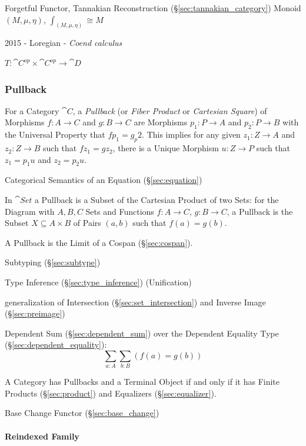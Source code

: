 Forgetful Functor, Tannakian Reconstruction (\S\ref{sec:tannakian_category})
Monoid $(M,\mu,\eta)$, $\int_{(M,\mu,\eta)} \cong M$

2015 - Loregian - \emph{Coend calculus}

$T : \cat{C}^{op} \times \cat{C}^{op} \rightarrow \cat{D}$



\subsubsection{Pullback}\label{sec:pullback}

For a Category $\cat{C}$, a \emph{Pullback} (or \emph{Fiber
  Product} or \emph{Cartesian Square}) of Morphisms $f : A \rightarrow
C$ and $g : B \rightarrow C$ are Morphisms $p_1 : P \rightarrow A$ and
$p_2 : P \rightarrow B$ with the Universal Property that $fp_1 =
g_p2$. This implies for any given $z_1 : Z \rightarrow A$ and $z_2 : Z
\rightarrow B$ such that $fz_1 = gz_2$, there is a Unique Morphism $u
: Z \rightarrow P$ such that $z_1 = p_1 u$ and $z_2 = p_2 u$.

Categorical Semantics of an Equation (\S\ref{sec:equation})

In $\cat{Set}$ a Pullback is a Subset of the Cartesian Product of two
Sets: for the Diagram with $A,B,C$ Sets and Functions $f : A
\rightarrow C$, $g : B \rightarrow C$, a Pullback is the Subset $X
\subseteq A \times B$ of Pairs $(a,b)$ such that $f(a) = g(b)$.

A Pullback is the Limit of a Cospan (\S\ref{sec:cospan}).

Subtyping (\S\ref{sec:subtype})

Type Inference (\S\ref{sec:type_inference}) (Unification)

generalization of Intersection (\S\ref{sec:set_intersection}) and
Inverse Image (\S\ref{sec:preimage})

Dependent Sum (\S\ref{sec:dependent_sum}) over the Dependent Equality
Type (\S\ref{sec:dependent_equality}):
\[
  \sum_{a:A} \sum_{b:B} (f(a) = g(b))
\]

A Category has Pullbacks and a Terminal Object if and only if it has Finite
Products (\S\ref{sec:product}) and Equalizers (\S\ref{sec:equalizer}).
\cite{awodey06}

Base Change Functor (\S\ref{sec:base_change})



\paragraph{Reindexed Family}\label{sec:reindexed_family}\hfill

